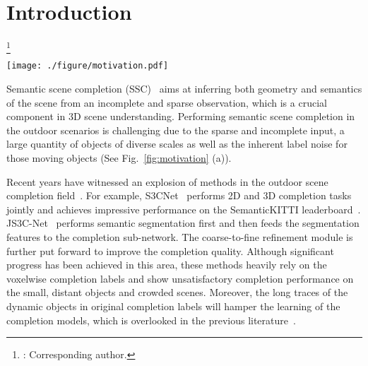\documentclass[10pt,twocolumn,letterpaper]{article}
\newcommand\blfootnote[1]{\begingroup
  \renewcommand\thefootnote{}\footnote{#1}\addtocounter{footnote}{-1}\endgroup
}
\begin{document}
\section{Introduction}
\label{sec:introduction}


\blfootnote{: Corresponding author.}



\begin{figure*}[t]
 \centering
 \texttt{[image: ./figure/motivation.pdf]}
 \vskip -0.3cm
 \caption{Left: challenges of semantic scene completion, \ie, (a) sparse and incomplete input, varying completion difficulty for objects of diverse scales and (b) long traces of dynamic objects in completion labels. Traces of cars and persons are highlighted by yellow ellipses. Right: (c) performance comparison between competitive completion algorithms and \algorithmname~on SemanticKITTI semantic scene completion challenge.}
 \centering
 \vskip -0.6cm
 \label{fig:motivation}
\end{figure*}

Semantic scene completion (SSC)~\cite{completion_survey} aims at inferring both geometry and semantics of the scene from an incomplete and sparse observation, which is a crucial component in 3D scene understanding. Performing semantic scene completion in the outdoor scenarios is challenging due to the sparse and incomplete input, a large quantity of objects of diverse scales as well as the inherent label noise for those moving objects (See Fig.~\ref{fig:motivation} (a)).


Recent years have witnessed an explosion of methods in the outdoor scene completion field~\cite{s3cnet,js3cnet,ssa-sc,sscnet,wilson2022motionsc,lmscnet}. For example, S3CNet~\cite{s3cnet} performs 2D and 3D completion tasks jointly and achieves impressive performance on the SemanticKITTI leaderboard~\cite{behley2019semantickitti}. JS3C-Net~\cite{js3cnet} performs semantic segmentation first and then feeds the segmentation features to the completion sub-network. The coarse-to-fine refinement module is further put forward to improve the completion quality. Although significant progress has been achieved in this area, these methods heavily rely on the voxelwise completion labels and show unsatisfactory completion performance on the small, distant objects and crowded scenes. Moreover, the long traces of the dynamic objects in original completion labels will hamper the learning of the completion models, which is overlooked in the previous literature~\cite{completion_survey}.
\end{document}
